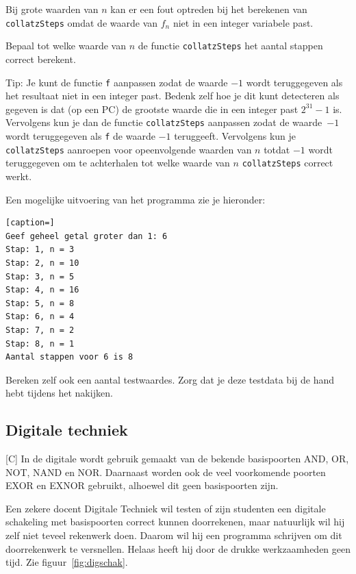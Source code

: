 \documentclass[a4paper,10pt,fleqn,twoside]{article}
\begin{document}
Bij grote waarden van $n$ kan er een fout optreden bij het berekenen van \lstinline|collatzSteps| omdat de waarde van $f_n$ niet in een integer variabele past. 

Bepaal tot welke waarde van $n$ de functie \lstinline|collatzSteps| het aantal stappen correct berekent.

Tip: Je kunt de functie \lstinline|f| aanpassen zodat de waarde $-1$ wordt teruggegeven als het resultaat niet in een integer past. Bedenk zelf hoe je dit kunt detecteren als gegeven is dat (op een PC) de grootste waarde die in een integer past $2^{31}-1$ is. Vervolgens kun je dan de functie \lstinline|collatzSteps| aanpassen zodat de waarde~$-1$ wordt teruggegeven als \lstinline|f| de waarde $-1$ teruggeeft. Vervolgens kun je \lstinline|collatzSteps| aanroepen voor opeenvolgende waarden van $n$ totdat $-1$ wordt teruggegeven om te achterhalen tot welke waarde van $n$ \lstinline|collatzSteps| correct werkt.

Een mogelijke uitvoering van het programma zie je hieronder:

\begin{lstlisting}[caption=]
Geef geheel getal groter dan 1: 6
Stap: 1, n = 3
Stap: 2, n = 10
Stap: 3, n = 5
Stap: 4, n = 16
Stap: 5, n = 8
Stap: 6, n = 4
Stap: 7, n = 2
Stap: 8, n = 1
Aantal stappen voor 6 is 8
\end{lstlisting}

Bereken zelf ook een aantal testwaardes. Zorg dat je deze testdata bij de hand hebt tijdens het nakijken.

\subsection{Digitale techniek}[C]
In de digitale wordt gebruik gemaakt van de bekende basispoorten AND, OR, NOT, NAND en NOR. Daarnaast worden ook de veel voorkomende poorten EXOR en EXNOR gebruikt, alhoewel dit geen basispoorten zijn.

Een zekere docent Digitale Techniek wil testen of zijn studenten een digitale schakeling met basispoorten correct kunnen doorrekenen, maar natuurlijk wil hij zelf niet teveel rekenwerk doen. Daarom wil hij een programma schrijven om dit doorrekenwerk te versnellen. Helaas heeft hij door de drukke werkzaamheden geen tijd. 
Zie figuur~\ref{fig:digschak}.
\end{document}
